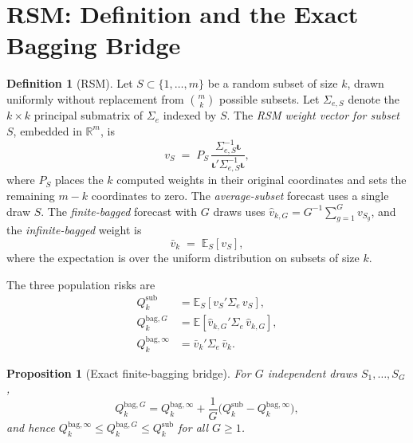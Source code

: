 \documentclass[12pt,a4paper]{article}
\newtheorem{proposition}{Proposition}
\theoremstyle{definition}
\newtheorem{definition}{Definition}
\newcommand{\Sig}{\Sigma_e}
\newcommand{\Qbag}{Q_k^{\mathrm{bag},\infty}}
\newcommand{\QbagG}{Q_k^{\mathrm{bag},G}}
\newcommand{\vbar}{\bar{v}_k}
\newcommand{\E}{\mathbb{E}}
\begin{document}
\section{RSM: Definition and the Exact Bagging Bridge}
\label{sec:rsm}

\begin{definition}[RSM]\label{def:rsm}
Let $S\subset\{1,\ldots,m\}$ be a random subset of size $k$, drawn
uniformly without replacement from $\binom{m}{k}$ possible subsets.
Let $\Sigma_{e,S}$ denote the $k\times k$ principal submatrix of $\Sig$ indexed
by $S$.  The \emph{RSM weight vector for subset $S$}, embedded in
$\mathbb{R}^m$, is
\begin{equation}
  v_S \;=\; P_S\,\frac{\Sigma_{e,S}^{-1}\bm{\iota}}{\bm{\iota}'\Sigma_{e,S}^{-1}\bm{\iota}},
\end{equation}
where $P_S$ places the $k$ computed weights in their original coordinates
and sets the remaining $m-k$ coordinates to zero.  The
\emph{average-subset} forecast uses a single draw $S$.  The
\emph{finite-bagged} forecast with $G$ draws uses
$\hat v_{k,G}=G^{-1}\sum_{g=1}^G v_{S_g}$, and the
\emph{infinite-bagged} weight is
\begin{equation}
  \vbar \;=\; \E_S[v_S],
\end{equation}
where the expectation is over the uniform distribution on subsets of size $k$.
\end{definition}

The three population risks are
\begin{align}
  Q_k^{\mathrm{sub}} &= \E_S[v_S'\Sig\, v_S],\label{eq:Qsub}\\
  Q_k^{\mathrm{bag},G} &= \E[\hat v_{k,G}'\Sig\,\hat v_{k,G}],\label{eq:QbagG}\\
  \Qbag &= \vbar'\Sig\,\vbar.\label{eq:Qbag}
\end{align}

\begin{proposition}[Exact finite-bagging bridge]\label{prop:bridge}
For $G$ independent draws $S_1,\ldots,S_G$,
\begin{equation}\label{eq:bridge}
  \QbagG = \Qbag + \frac{1}{G}\bigl(Q_k^{\mathrm{sub}}-\Qbag\bigr),
\end{equation}
and hence $\Qbag\le Q_k^{\mathrm{bag},G}\le Q_k^{\mathrm{sub}}$ for all $G\ge 1$.
\end{proposition}
\end{document}
